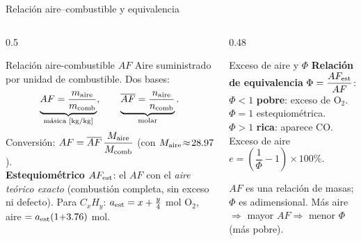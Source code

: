 \documentclass[aspectratio=169,10pt]{beamer}
\begin{document}
\begin{frame}{Relación aire--combustible y equivalencia}
\begin{columns}[T]
\begin{column}{0.5\textwidth}
\begin{cardidea}{Relación aire-combustible $AF$}{\faBalanceScale}
Aire suministrado por unidad de combustible. Dos bases:
$$\underbrace{AF=\frac{m_{\rm aire}}{m_{\rm comb}}}_{\text{másica }[\text{kg/kg}]},\qquad \underbrace{\overline{AF}=\frac{n_{\rm aire}}{n_{\rm comb}}}_{\text{molar}}.$$
Conversión: $AF=\overline{AF}\,\dfrac{M_{\rm aire}}{M_{\rm comb}}$ (con $M_{\rm aire}\!\approx\!28.97$).\\[0.7mm]
\textbf{Estequiométrico $AF_{\rm est}$}: el $AF$ con el \emph{aire teórico exacto} (combustión completa, sin exceso ni defecto). Para $C_xH_y$: $a_{\rm est}=x+\tfrac{y}{4}$ mol $\mathrm{O_2}$, aire $=a_{\rm est}(1{+}3.76)$ mol.
\end{cardidea}
\end{column}
\begin{column}{0.48\textwidth}
\begin{cardgear}{Exceso de aire y $\Phi$}{\faSlidersH}
\textbf{Relación de equivalencia} $\Phi=\dfrac{AF_{\rm est}}{AF}$:\\[0.5mm]
$\Phi<1$ \textbf{pobre}: exceso de $\mathrm{O_2}$.\\[0.3mm]
$\Phi=1$ estequiométrica.\\[0.3mm]
$\Phi>1$ \textbf{rica}: aparece CO.\\[0.5mm]
Exceso de aire $e=\left(\dfrac{1}{\Phi}-1\right)\times100\%$.
\end{cardgear}
\vspace{0.8mm}
\begin{cardnota}[\faExclamationTriangle]
$AF$ es una relación de masas; $\Phi$ es adimensional. Más aire $\Rightarrow$ mayor $AF\Rightarrow$ menor $\Phi$ (más pobre).
\end{cardnota}
\end{column}
\end{columns}
\end{frame}
\end{document}
